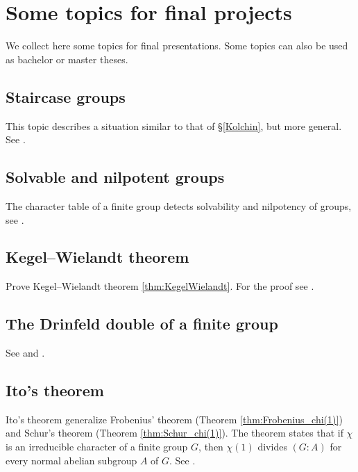\section{Some topics for final projects}

\pagestyle{plain}
\fancyhf{}
\fancyfoot[CE,CO]{\leftmark}
\fancyfoot[LE,RO]{\thepage}

We collect here some topics for final presentations. Some topics
can also be used as bachelor or master theses. 

\subsection*{Staircase groups}

This topic describes a situation similar to that of \S\ref{Kolchin}, but
more general. See \cite[Chapter 5]{MR1369573}.

\subsection*{Solvable and nilpotent groups}

The character table of a finite group
detects solvability and nilpotency of groups, see
\cite[Chapter 6]{MR1369573}.

\subsection*{Kegel--Wielandt theorem}

Prove Kegel--Wielandt theorem \ref{thm:KegelWielandt}. 
For the proof see \cite[Theorem 2.13]{MR1211633}. 

\subsection*{The Drinfeld double of a finite group}

See \cite[Chapter IX]{MR1321145} and 
\cite[Chapter 8]{MR3752618}.

\subsection*{Ito's theorem}

Ito's theorem generalize Frobenius' theorem
(Theorem \ref{thm:Frobenius_chi(1)})  
and Schur's theorem (Theorem \ref{thm:Schur_chi(1)}). 
The theorem states that if $\chi$ is an irreducible character
of a finite group $G$, then $\chi(1)$ divides 
$(G:A)$ for every normal abelian subgroup $A$ of $G$. 
See \cite[\S8.1]{MR0450380}. 

